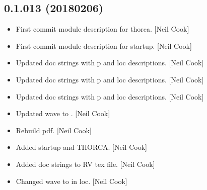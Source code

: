 \documentclass[a4paper,10pt,english]{report}
\begin{document}
\subsection{0.1.013 (2018\sphinxhyphen{}02\sphinxhyphen{}06)}
\label{\detokenize{misc/changelog:id509}}\begin{itemize}
\item {} 
First commit module description for thorca. {[}Neil Cook{]}

\item {} 
First commit module description for startup. {[}Neil Cook{]}

\item {} 
Updated doc strings with p and loc descriptions. {[}Neil Cook{]}

\item {} 
Updated doc strings with p and loc descriptions. {[}Neil Cook{]}

\item {} 
Updated doc strings with p and loc descriptions. {[}Neil Cook{]}

\item {} 
Updated wave to . {[}Neil Cook{]}

\item {} 
Rebuild pdf. {[}Neil Cook{]}

\item {} 
Added startup and THORCA. {[}Neil Cook{]}

\item {} 
Added doc strings to RV tex file. {[}Neil Cook{]}

\item {} 
Changed wave to  in loc. {[}Neil Cook{]}

\end{itemize}
\end{document}
